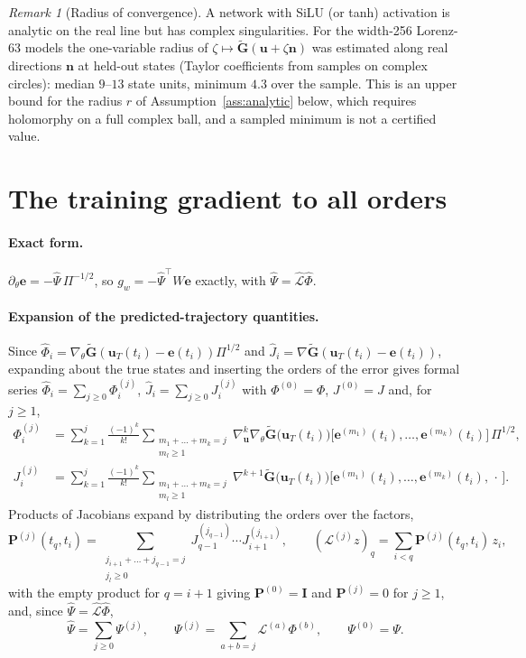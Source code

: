\documentclass[11pt]{article}
\theoremstyle{definition}
\theoremstyle{remark}
\newtheorem{remark}{Remark}
\newcommand{\uu}{\mathbf{u}}
\newcommand{\ee}{\mathbf{e}}
\newcommand{\Gt}{\tilde{\mathbf{G}}}
\newcommand{\I}{\mathbf{I}}
\newcommand{\LL}{\mathcal{L}}
\newcommand{\Pp}{\mathbf P}
\newcommand{\LLh}{\hat{\mathcal{L}}}
\newcommand{\Phih}{\hat\Phi}
\newcommand{\Psih}{\hat\Psi}
\begin{document}
\begin{remark}[Radius of convergence]\label{rem:radius}
A network with SiLU (or tanh) activation is analytic on the real line but has complex singularities.
For the width-256 Lorenz-63 models the one-variable radius of $\zeta\mapsto\Gt(\uu+\zeta\mathbf n)$ was estimated along real directions $\mathbf n$ at held-out states (Taylor coefficients from samples on complex circles): median $9$--$13$ state units, minimum $4.3$ over the sample.
This is an upper bound for the radius $r$ of Assumption~\ref{ass:analytic} below, which requires holomorphy on a full complex ball, and a sampled minimum is not a certified value.
\end{remark}

\section{The training gradient to all orders}\label{sec:grad}

\paragraph{Exact form.}
$\partial_\theta\ee=-\Psih\,\Pi^{-1/2}$, so $g_w=-\Psih^\top W\ee$ exactly, with $\Psih=\LLh\Phih$.

\paragraph{Expansion of the predicted-trajectory quantities.}
Since $\Phih_i=\nabla_\theta\Gt(\uu_T(t_i)-\ee(t_i))\Pi^{1/2}$ and $\hat J_i=\nabla\Gt(\uu_T(t_i)-\ee(t_i))$, expanding about the true states and inserting the orders of the error gives formal series $\Phih_i=\sum_{j\ge0}\Phi^{(j)}_i$, $\hat J_i=\sum_{j\ge0}J^{(j)}_i$ with $\Phi^{(0)}=\Phi$, $J^{(0)}=J$ and, for $j\ge1$,
\begin{align}
\Phi^{(j)}_i&=\sum_{k=1}^{j}\frac{(-1)^k}{k!}\sum_{\substack{m_1+\dots+m_k=j\\ m_l\ge1}}\nabla_\uu^k\nabla_\theta\Gt\big(\uu_T(t_i)\big)\big[\ee^{(m_1)}(t_i),\dots,\ee^{(m_k)}(t_i)\big]\,\Pi^{1/2},\label{eq:Phij}\\
J^{(j)}_i&=\sum_{k=1}^{j}\frac{(-1)^k}{k!}\sum_{\substack{m_1+\dots+m_k=j\\ m_l\ge1}}\nabla^{k+1}\Gt\big(\uu_T(t_i)\big)\big[\ee^{(m_1)}(t_i),\dots,\ee^{(m_k)}(t_i),\,\cdot\,\big].\label{eq:Jj}
\end{align}
Products of Jacobians expand by distributing the orders over the factors,
\[
\Pp^{(j)}(t_q,t_i)=\sum_{\substack{j_{i+1}+\dots+j_{q-1}=j\\ j_l\ge0}}J^{(j_{q-1})}_{q-1}\cdots J^{(j_{i+1})}_{i+1},\qquad (\LL^{(j)}z)_q=\sum_{i<q}\Pp^{(j)}(t_q,t_i)\,z_i ,
\]
with the empty product for $q=i+1$ giving $\Pp^{(0)}=\I$ and $\Pp^{(j)}=0$ for $j\ge1$,
and, since $\Psih=\LLh\Phih$,
\begin{equation}\label{eq:Psij}
\Psih=\sum_{j\ge0}\Psi^{(j)},\qquad \Psi^{(j)}=\sum_{a+b=j}\LL^{(a)}\Phi^{(b)},\qquad \Psi^{(0)}=\Psi .
\end{equation}
\end{document}
